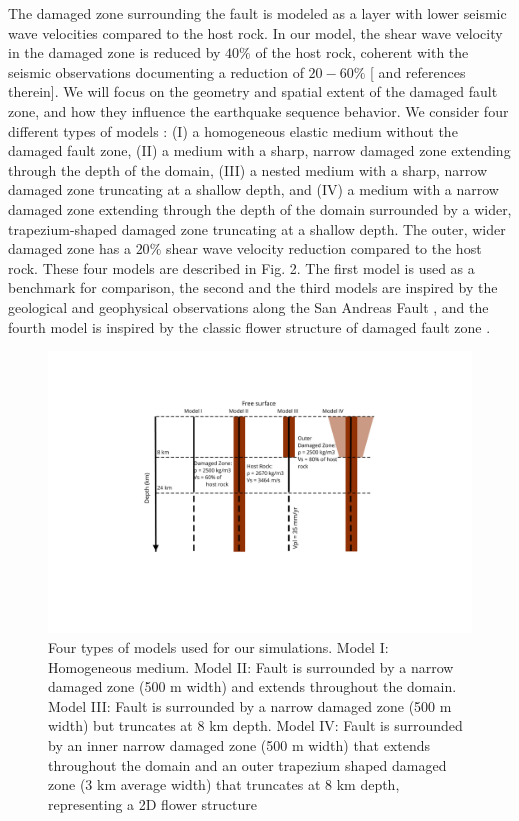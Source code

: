 \documentclass[11pt]{article}
\newcommand{\yihe}[1]{{\color{red}#1}}
\begin{document}
The damaged zone surrounding the fault is modeled as a layer with lower seismic wave velocities compared to the host rock. In our model, the shear wave velocity in the damaged zone is reduced by $40\%$ of the host rock, \yihe{coherent with the seismic observations documenting a reduction of $20-60\%$ [\citealp[table 1]{huang_2014} and references therein]}. We will focus on the geometry and spatial extent of the damaged fault zone, and how they influence the earthquake sequence behavior. We consider four different types of models : (I) a homogeneous elastic medium without the damaged fault zone, (II) a medium with a sharp, narrow damaged zone extending through the depth of the domain, (III) a nested medium with a sharp, narrow damaged zone truncating at a shallow depth, and (IV) a medium with a narrow damaged zone extending through the depth of the domain surrounded by a wider, trapezium-shaped damaged zone truncating at a shallow depth. The outer, wider damaged zone \yihe{has a $20\%$ shear wave velocity reduction compared to the host rock}. These four models are described in Fig. 2. The first model is used as a benchmark for comparison, the second and the third models are inspired by the geological and geophysical observations along the San Andreas Fault \citep{li_2006, lewis_2010}, and the fourth model is inspired by the classic flower structure of damaged fault zone \citep{sibson_1977, unsworth_1997, caine_1996, pelties_2015, perrin_2016}.

\begin{figure}[!htb]
    \centering
    \label{fig2}
    \includegraphics[scale=0.3]{2.pdf}
    \caption{Four types of models used for our simulations. Model I: Homogeneous medium. Model II: Fault is surrounded by a narrow damaged zone (500 m width) and extends throughout the domain. Model III: Fault is surrounded by a narrow damaged zone (500 m width) but truncates at 8 km depth. Model IV: Fault is surrounded by an inner narrow damaged zone (500 m width) that extends throughout the domain and an outer trapezium shaped damaged zone (3 km average width) that truncates at 8 km depth, representing a 2D flower structure}
\end{figure}
\end{document}
